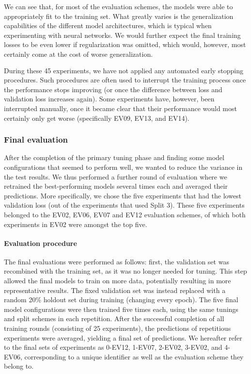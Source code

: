 We can see that, for most of the evaluation schemes, the models were able to appropriately fit to the training set. What greatly varies is the generalization capabilities of the different model architectures, which is typical when experimenting with neural networks. We would further expect the final training losses to be even lower if regularization was omitted, which would, however, most certainly come at the cost of worse generalization.

During these 45 experiments, we have not applied any automated early stopping procedures. Such procedures are often used to interrupt the training process once the performance stops improving (or once the difference between loss and validation loss increases again). Some experiments have, however, been interrupted manually, once it became clear that their performance would most certainly only get worse (specifically EV09, EV13, and EV14).

\subsubsection{Final evaluation}
After the completion of the primary tuning phase and finding some model configurations that seemed to perform well, we wanted to reduce the variance in the test results. We thus performed a further round of evaluation where we retrained the best-performing models several times each and averaged their predictions. More specifically, we chose the five experiments that had the lowest validation loss (out of the experiments that used Split 3). These five experiments belonged to the EV02, EV06, EV07 and EV12 evaluation schemes, of which both experiments in EV02 were amongst the top five.

\paragraph{Evaluation procedure}
The final evaluations were performed as follows: first, the validation set was recombined with the training set, as it was no longer needed for tuning. This step allowed the final models to train on more data, potentially resulting in more representative results. The fixed validation set was instead replaced with a random 20\% holdout set during training (changing every epoch). The five final model configurations were then trained five times each, using the same tunings and split schemes in each repetition. After the successful completion of all training rounds (consisting of 25 experiments), the predictions of repetitious experiments were averaged, yielding a final set of predictions. We hereafter refer to the final sets of experiments as 0-EV12, 1-EV07, 2-EV02, 3-EV02, and 4-EV06, corresponding to a unique identifier as well as the evaluation scheme they belong to.

